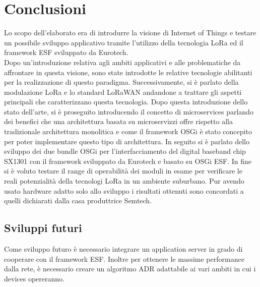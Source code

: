 \chapter{Conclusioni}
Lo scopo dell’elaborato era di introdurre la visione di Internet of Things e
testare un possibile sviluppo applicativo tramite l'utilizzo della tecnologia  
LoRa ed il framework ESF sviluppato da Eurotech.\\
Dopo un'introduzione relativa agli ambiti applicativi e alle problematiche da
affrontare in questa visione, sono state introdotte le relative tecnologie
abilitanti per la realizzazione di  questo paradigma. 
Successivamente, si è parlato della modulazione LoRa e lo standard LoRaWAN
andandone a trattare gli aspetti principali che caratterizzano questa
tecnologia.
Dopo questa introduzione dello stato dell'arte, si è proseguito introducendo il
concetto di microservices parlando dei benefici  che una architettura basata su
microservizzi offre rispetto alla tradizionale architettura monolitica e come il
framework OSGi è stato concepito per poter implementare questo tipo di
architettura.
In seguito si è parlato dello sviluppo dei due bundle OSGi per
l'interfacciamento del digital baseband chip SX1301 con il framework sviluppato
da Eurotech e basato su OSGi ESF.
In fine si è voluto testare il range di operabilità dei moduli in esame per
verificare le reali potenzialità della tecnologi LoRa in un ambiente suburbano.
Pur avendo usato hardware adatto solo allo sviluppo   i
risultati ottenuti sono concordati a quelli dichiarati dalla casa produttrice
Semtech.
\section{Sviluppi futuri}
Come sviluppo futuro è necessario integrare un application server in grado di
cooperare con il framework ESF. Inoltre per ottenere le massime performance
dalla rete, è necessario creare un algoritmo ADR adattabile ai vari ambiti in
cui i devices opereranno.
